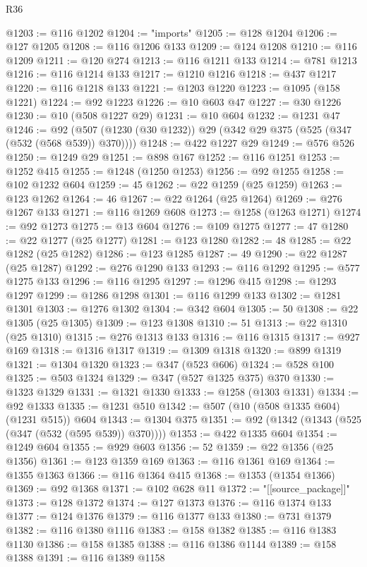 \begin{lexlean}{R36}
\begin{coremodule}
@1203 := @116 @1202
@1204 := "imports"
@1205 := @128 @1204
@1206 := @127 @1205
@1208 := @116 @1206 @133
@1209 := @124 @1208
@1210 := @116 @1209
@1211 := @120 @274
@1213 := @116 @1211 @133
@1214 := @781 @1213
@1216 := @116 @1214 @133
@1217 := @1210 @1216
@1218 := @437 @1217
@1220 := @116 @1218 @133
@1221 := @1203 @1220
@1223 := @1095 (@158 @1221)
@1224 := @92 @1223
@1226 := @10 @603 @47
@1227 := @30 @1226
@1230 := @10 (@508 @1227 @29)
@1231 := @10 @604
@1232 := @1231 @47
@1246 := @92 (@507 (@1230 (@30 @1232)) @29 (@342 @29 @375 (@525 (@347 (@532 (@568 @539)) @370))))
@1248 := @422 @1227 @29
@1249 := @576 @526
@1250 := @1249 @29
@1251 := @898 @167
@1252 := @116 @1251
@1253 := @1252 @415
@1255 := @1248 (@1250 @1253)
@1256 := @92 @1255
@1258 := @102 @1232 @604
@1259 := 45
@1262 := @22 @1259 (@25 @1259)
@1263 := @123 @1262
@1264 := 46
@1267 := @22 @1264 (@25 @1264)
@1269 := @276 @1267 @133
@1271 := @116 @1269 @608
@1273 := @1258 (@1263 @1271)
@1274 := @92 @1273
@1275 := @13 @604
@1276 := @109 @1275
@1277 := 47
@1280 := @22 @1277 (@25 @1277)
@1281 := @123 @1280
@1282 := 48
@1285 := @22 @1282 (@25 @1282)
@1286 := @123 @1285
@1287 := 49
@1290 := @22 @1287 (@25 @1287)
@1292 := @276 @1290 @133
@1293 := @116 @1292
@1295 := @577 @1275 @133
@1296 := @116 @1295
@1297 := @1296 @415
@1298 := @1293 @1297
@1299 := @1286 @1298
@1301 := @116 @1299 @133
@1302 := @1281 @1301
@1303 := @1276 @1302
@1304 := @342 @604
@1305 := 50
@1308 := @22 @1305 (@25 @1305)
@1309 := @123 @1308
@1310 := 51
@1313 := @22 @1310 (@25 @1310)
@1315 := @276 @1313 @133
@1316 := @116 @1315
@1317 := @927 @169
@1318 := @1316 @1317
@1319 := @1309 @1318
@1320 := @899 @1319
@1321 := @1304 @1320
@1323 := @347 (@523 @606)
@1324 := @528 @100
@1325 := @503 @1324
@1329 := @347 (@527 @1325 @375) @370
@1330 := @1323 @1329
@1331 := @1321 @1330
@1333 := @1258 (@1303 @1331)
@1334 := @92 @1333
@1335 := @1231 @510
@1342 := @507 (@10 (@508 @1335 @604) (@1231 @515)) @604
@1343 := @1304 @375
@1351 := @92 (@1342 (@1343 (@525 (@347 (@532 (@595 @539)) @370))))
@1353 := @422 @1335 @604
@1354 := @1249 @604
@1355 := @929 @603
@1356 := 52
@1359 := @22 @1356 (@25 @1356)
@1361 := @123 @1359 @169
@1363 := @116 @1361 @169
@1364 := @1355 @1363
@1366 := @116 @1364 @415
@1368 := @1353 (@1354 @1366)
@1369 := @92 @1368
@1371 := @102 @628 @11
@1372 := "[[source_package]]"
@1373 := @128 @1372
@1374 := @127 @1373
@1376 := @116 @1374 @133
@1377 := @124 @1376
@1379 := @116 @1377 @133
@1380 := @731 @1379
@1382 := @116 @1380 @1116
@1383 := @158 @1382
@1385 := @116 @1383 @1130
@1386 := @158 @1385
@1388 := @116 @1386 @1144
@1389 := @158 @1388
@1391 := @116 @1389 @1158

\end{coremodule}
\end{lexlean}
